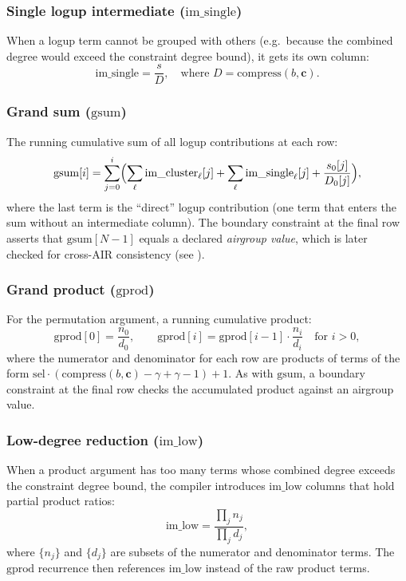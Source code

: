 \subsubsection*{Single logup intermediate ($\mathrm{im\_single}$)}

When a logup term cannot be grouped with others
(e.g.\ because the combined degree would exceed the constraint degree bound),
it gets its own column:
\[
  \mathrm{im\_single} = \frac{s}{D},
  \quad\text{where } D = \mathrm{compress}(b, \mathbf{c}).
\]

\subsubsection*{Grand sum ($\mathrm{gsum}$)}

The running cumulative sum of all logup contributions at each row:
\[
  \mathrm{gsum}[i] = \sum_{j=0}^{i}\Bigl(
    \sum_{\ell} \mathrm{im\_cluster}_\ell[j]
    + \sum_{\ell} \mathrm{im\_single}_\ell[j]
    + \frac{s_0[j]}{D_0[j]}
  \Bigr),
\]
where the last term is the ``direct'' logup contribution
(one term that enters the sum without an intermediate column).
The boundary constraint at the final row asserts that $\mathrm{gsum}[N-1]$
equals a declared \emph{air\-group value},
which is later checked for cross-AIR consistency
(see ).

\subsubsection*{Grand product ($\mathrm{gprod}$)}

For the permutation argument, a running cumulative product:
\[
  \mathrm{gprod}[0] = \frac{n_0}{d_0}, \qquad
  \mathrm{gprod}[i] = \mathrm{gprod}[i-1] \cdot \frac{n_i}{d_i}
  \quad\text{for } i > 0,
\]
where the numerator and denominator for each row are products of
terms of the form
$\mathrm{sel} \cdot (\mathrm{compress}(b, \mathbf{c}) - \gamma + \gamma - 1) + 1$.
As with $\mathrm{gsum}$, a boundary constraint at the final row checks the
accumulated product against an airgroup value.

\subsubsection*{Low-degree reduction ($\mathrm{im\_low}$)}

When a product argument has too many terms whose combined degree
exceeds the constraint degree bound,
the compiler introduces $\mathrm{im\_low}$ columns that hold partial
product ratios:
\[
  \mathrm{im\_low} = \frac{\prod_j n_j}{\prod_j d_j},
\]
where $\{n_j\}$ and $\{d_j\}$ are subsets of the numerator and denominator
terms.
The $\mathrm{gprod}$ recurrence then references $\mathrm{im\_low}$
instead of the raw product terms.

